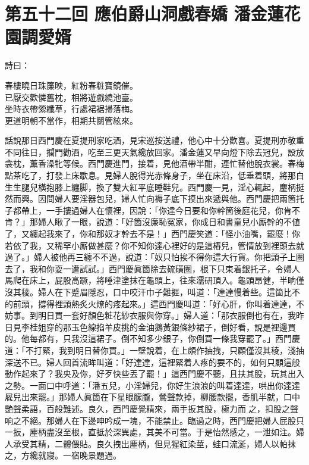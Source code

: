
\chapter*{第五十二回 應伯爵山洞戲春嬌 潘金蓮花園調愛婿}


詩曰：

\begin{myquote} 
春樓曉日珠簾映，紅粉春粧寶鏡催。\\已厭交歡憐舊枕，相將遊戲繞池臺。\\坐時衣帶縈纖草，行處裙裾掃落梅。\\更道明朝不當作，相期共鬬管絃來。
\end{myquote} 

話說那日西門慶在夏提刑家吃酒，見宋巡按送禮，他心中十分歡喜。夏提刑亦敬重不同往日，{}攔門勸酒，吃至三更天氣纔放回家。潘金蓮又早向燈下除去冠兒，設放衾枕，薰香澡牝等候。西門慶進門，接着，見他酒帶半酣，連忙替他脫衣裳。春梅點茶吃了，打發上床歇息。見婦人脫得光赤條身子，坐在床沿，低垂着頭，將那白生生腿兒橫抱膝上纏脚，{}換了雙大紅平底睡鞋兒。西門慶一見，淫心輒起，麈柄挺然而興。因問婦人要淫器包兒，婦人忙向褥子底下摸出來遞與他。西門慶把兩箇托子都帶上，一手摟過婦人在懷裡，因說：「你達今日要和你幹箇後庭花兒，你肯不肯？」那婦人瞅了一眼，說道：「好箇沒廉恥冤家，你成日和書童兒小厮幹的不値了，又纏起我來了，你和那奴才幹去不是！」西門慶笑道：「怪小油嘴，罷麼！你若依了我，又稀罕小厮做甚麼？你不知你達心裡好的是這樁兒，管情放到裡頭去就過了。」{}婦人被他再三纏不不過，說道：「奴只怕挨不得你這大行貨。你把頭子上圈去了，我和你耍一遭試試。」西門慶眞箇除去硫磺圈，根下只束着銀托子，令婦人馬爬在床上，屁股高蹶，將唾津塗抹在龜頭上，往來濡研頂入。龜頭昂健，半晌僅沒其稜。婦人在下蹙眉隱忍，口中咬汗巾子難捱，叫道：「達達慢着些。這箇比不的前頭，撐得裡頭熱炙火燎的疼起來。」這西門慶叫道：「好心肝，你叫着達達，不妨事。到明日買一套好顏色粧花紗衣服與你穿。」婦人道：「那衣服倒也有在，我昨日見李桂姐穿的那玉色線掐羊皮挑的金油鵝黃銀條紗裙子，倒好看，說是裡邊買的。他每都有，只我沒這裙子。倒不知多少銀子，你倒買一條我穿罷了。」西門慶道：「不打緊，我到明日替你買。」一壁說着，在上頗作抽拽，只顧僅沒其稜，淺抽深送不已。婦人回首流眸叫道：「好達達，這裡緊着人疼的要不的，如何只顧這般動作起來了？我央及你，好歹快些丟了罷！」這西門慶不聽，且扶其股，玩其出入之勢。一面口中呼道：「潘五兒，小淫婦兒，你好生浪浪的叫着達達，哄出你達達㞞兒出來罷。」那婦人眞箇在下星眼朦朧，鶯聲款掉，柳腰款擺，香肌半就，口中艷聲柔語，百般難述。良久，西門慶覺精來，兩手扳其股，極力而𢵞之，扣股之聲响之不絕。那婦人在下邊呻吟成一塊，不能禁止。臨過之時，西門慶把婦人屁股只一扳，麈柄盡沒至根，直抵於深異處，其美不可當。于是怡然感之，一泄如注。婦人承受其精，二體偎貼。良久拽出麈柄，但見猩紅染莖，蛙口流涎，婦人以帕抹之，方纔就寢。一宿晚景題過。

